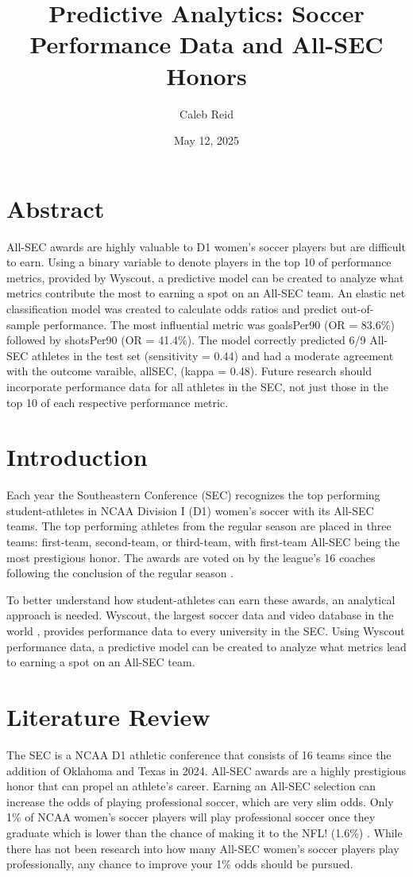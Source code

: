 \documentclass{article}
\title{Predictive Analytics: Soccer Performance Data
and All-SEC Honors}
\author{Caleb Reid}
\date{May 12, 2025}
\begin{document}
\maketitle

\section{Abstract}
All-SEC awards are highly valuable to D1 women's soccer players but are difficult to earn. Using a binary variable to denote players in the top 10 of performance metrics, provided by Wyscout, a predictive model can be created to analyze what metrics contribute the most to earning a spot on an All-SEC team. An elastic net classification model was created to calculate odds ratios and predict out-of-sample performance. The most influential metric was goalsPer90 (OR = 83.6\%) followed by shotsPer90 (OR = 41.4\%). The model correctly predicted 6/9 All-SEC athletes in the test set (sensitivity = 0.44) and had a moderate agreement with the outcome varaible, allSEC, (kappa = 0.48). Future research should incorporate performance data for all athletes in the SEC, not just those in the top 10 of each respective performance metric.

\section{Introduction}
Each year the Southeastern Conference (SEC) recognizes the top performing student-athletes in NCAA Division I (D1) women’s soccer with its All-SEC teams. The top performing athletes from the regular season are placed in three teams: first-team, second-team, or third-team, with first-team All-SEC being the most prestigious honor. The awards are voted on by the league’s 16 coaches following the conclusion of the regular season \cite{sec2025}.

To better understand how student-athletes can earn these awards, an analytical approach is needed. Wyscout, the largest soccer data and video database in the world \cite{wyscout}, provides performance data to every university in the SEC. Using Wyscout performance data, a predictive model can be created to analyze what metrics lead to earning a spot on an All-SEC team. 

\section{Literature Review}
The SEC is a NCAA D1 athletic conference that consists of 16 teams since the addition of Oklahoma and Texas in 2024. All-SEC awards are a highly prestigious honor that can propel an athlete’s career. Earning an All-SEC selection can increase the odds of playing professional soccer, which are very slim odds. Only 1\% of NCAA women’s soccer players will play professional soccer once they graduate \cite{howManyPlayers2025}which is lower than the chance of making it to the NFL! (1.6\%) \cite{cesconetto2021}. While there has not been research into how many All-SEC women’s soccer players play professionally, any chance to improve your 1\% odds should be pursued.
\end{document}
